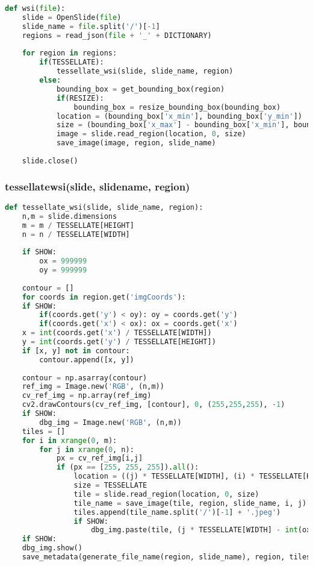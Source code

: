 \begin{lstlisting}[frame=single,language=python]
def wsi(file):
	slide = OpenSlide(file)
	slide_name = file.split('/')[-1]
	regions = read_json(file + '_' + DICTIONARY)
	
	for region in regions:
		if(TESSELLATE):
			tessellate_wsi(slide, slide_name, region)
		else:
			bounding_box = get_bounding_box(region)
			if(RESIZE):
				bounding_box = resize_bounding_box(bounding_box)
			location = (bounding_box['x_min'], bounding_box['y_min'])
			size = (bounding_box['x_max'] - bounding_box['x_min'], bounding_box['y_max'] - bounding_box['y_min'])
			image = slide.read_region(location, 0, size)
			save_image(image, region, slide_name)
	
	slide.close()
\end{lstlisting}


\subsubsection{tessellate{\textunderscore}wsi(slide, slide{\textunderscore}name, region)}

\begin{lstlisting}[frame=single,language=python]
def tessellate_wsi(slide, slide_name, region):
	n,m = slide.dimensions
	m = m / TESSELLATE[HEIGHT]
	n = n / TESSELLATE[WIDTH]
	
	if SHOW:
		ox = 999999
		oy = 999999
	
	contour = []
	for coords in region.get('imgCoords'):
	if SHOW:
		if(coords.get('y') < oy): oy = coords.get('y')
		if(coords.get('x') < ox): ox = coords.get('x')
	x = int(coords.get('x') / TESSELLATE[WIDTH])
	y = int(coords.get('y') / TESSELLATE[HEIGHT])
	if [x, y] not in contour:
		contour.append([x, y])
	
	contour = np.asarray(contour)
	ref_img = Image.new('RGB', (n,m))
	cv_ref_img = np.array(ref_img)
	cv2.drawContours(cv_ref_img, [contour], 0, (255,255,255), -1)
	if SHOW:
		dbg_img = Image.new('RGB', (n,m))
	tiles = []
	for i in xrange(0, m):
		for j in xrange(0, n):
			px = cv_ref_img[i,j]
			if (px == [255, 255, 255]).all():
				location = ((j) * TESSELLATE[WIDTH], (i) * TESSELLATE[HEIGHT])
				size = TESSELLATE
				tile = slide.read_region(location, 0, size)
				tile_name = save_image(tile, region, slide_name, i, j)
				tiles.append(tile_name.split('/')[-1] + '.jpeg')
				if SHOW:
					dbg_img.paste(tile, (j * TESSELLATE[WIDTH] - int(ox), i * TESSELLATE[HEIGHT] - int(oy)))
	if SHOW:
	dbg_img.show()
	save_metadata(generate_file_name(region, slide_name), region, tiles)
\end{lstlisting}


